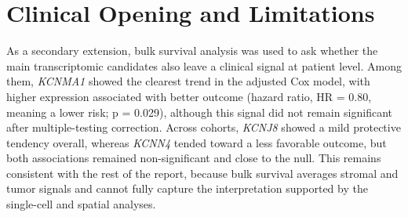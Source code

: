 \documentclass[11pt,a4paper]{article}
\begin{document}
\section*{Clinical Opening and Limitations}
As a secondary extension, bulk survival analysis was used to ask whether the main transcriptomic candidates also leave a clinical signal at patient level. Among them, \textit{KCNMA1} showed the clearest trend in the adjusted Cox model, with higher expression associated with better outcome (hazard ratio, HR = 0.80, meaning a lower risk; p = 0.029), although this signal did not remain significant after multiple-testing correction. Across cohorts, \textit{KCNJ8} showed a mild protective tendency overall, whereas \textit{KCNN4} tended toward a less favorable outcome, but both associations remained non-significant and close to the null. This remains consistent with the rest of the report, because bulk survival averages stromal and tumor signals and cannot fully capture the interpretation supported by the single-cell and spatial analyses.
\end{document}
